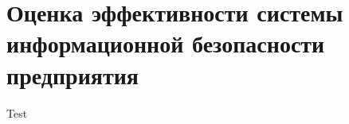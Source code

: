
\section{Оценка эффективности системы информационной безопасности предприятия}
\label{sec:efficiency}

Test

